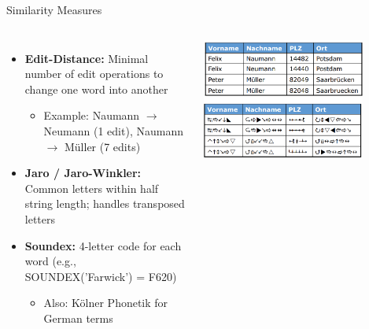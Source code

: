 \documentclass[aspectratio=169]{../latex_main/tntbeamer}  %
\begin{document}
\begin{frame}[c]{Similarity Measures}

\begin{columns}


    \begin{itemize}
        \item \textbf{Edit-Distance:} Minimal number of edit operations to change one word into another
        \begin{itemize}
            \item Example: Naumann $\rightarrow$ Neumann (1 edit), Naumann $\rightarrow$ Müller (7 edits)
        \end{itemize}
        \item \textbf{Jaro / Jaro-Winkler:} Common letters within half string length; handles transposed letters
        \item \textbf{Soundex:} 4-letter code for each word (e.g., SOUNDEX('Farwick') = F620)
        \begin{itemize}
            \item Also: Kölner Phonetik for German terms
        \end{itemize}
    \end{itemize}



        \centering\includegraphics[width=0.8\textwidth]{figure/bild26_similarity}

\end{columns}

\end{frame}
\end{document}
